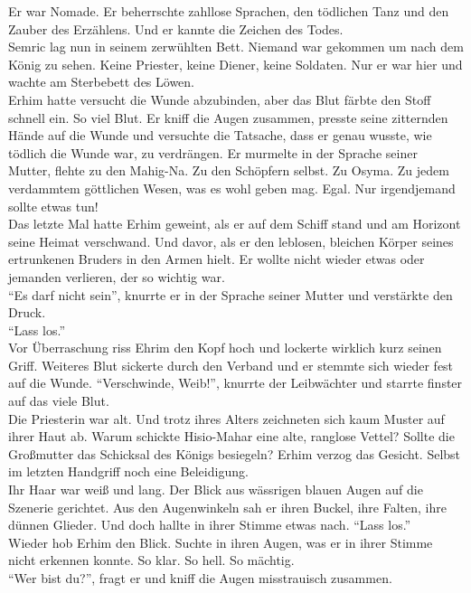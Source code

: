 Er war Nomade. Er beherrschte zahllose Sprachen, den tödlichen Tanz und den Zauber des Erzählens. 
Und er kannte die Zeichen des Todes.\\
Semric lag nun in seinem zerwühlten Bett. Niemand war gekommen um nach dem König zu sehen. Keine 
Priester, keine Diener, keine Soldaten. Nur er war hier und wachte am Sterbebett des Löwen.\\
Erhim hatte versucht die Wunde abzubinden, aber das Blut färbte den Stoff schnell ein. So viel 
Blut. Er kniff die Augen zusammen, presste seine zitternden Hände auf die Wunde und versuchte die 
Tatsache, dass er genau wusste, wie tödlich die Wunde war, zu verdrängen. Er murmelte in der 
Sprache seiner Mutter, flehte zu den Mahig-Na. Zu den Schöpfern selbst. Zu Osyma. Zu jedem 
verdammtem göttlichen Wesen, was es wohl geben mag. Egal. Nur irgendjemand sollte etwas tun!\\
Das letzte Mal hatte Erhim geweint, als er auf dem Schiff stand und am Horizont seine Heimat 
verschwand. Und davor, als er den leblosen, bleichen Körper seines ertrunkenen Bruders in den Armen 
hielt. Er wollte nicht wieder etwas oder jemanden verlieren, der so wichtig war.\\ ``Es darf nicht 
sein'', knurrte er in der Sprache seiner Mutter und verstärkte den Druck.\\
``Lass los.''\\
Vor Überraschung riss Ehrim den Kopf hoch und lockerte wirklich kurz seinen Griff. Weiteres Blut 
sickerte durch den Verband und er stemmte sich wieder fest auf die Wunde. ``Verschwinde, Weib!'', 
knurrte der Leibwächter und starrte finster auf das viele Blut.\\
Die Priesterin war alt. Und trotz ihres Alters zeichneten sich kaum Muster auf ihrer Haut ab. Warum 
schickte Hisio-Mahar eine alte, ranglose Vettel? Sollte die Großmutter das Schicksal des Königs 
besiegeln? Erhim verzog das Gesicht. Selbst im letzten Handgriff noch eine Beleidigung.\\
Ihr Haar war weiß und lang. Der Blick aus wässrigen blauen Augen auf die Szenerie gerichtet. Aus 
den Augenwinkeln sah er ihren Buckel, ihre Falten, ihre dünnen Glieder. Und doch hallte in ihrer 
Stimme etwas nach. ``Lass los.''\\
Wieder hob Erhim den Blick. Suchte in ihren Augen, was er in ihrer Stimme nicht erkennen konnte. So 
klar. So hell. So mächtig.\\
``Wer bist du?'', fragt er und kniff die Augen misstrauisch zusammen.\\
